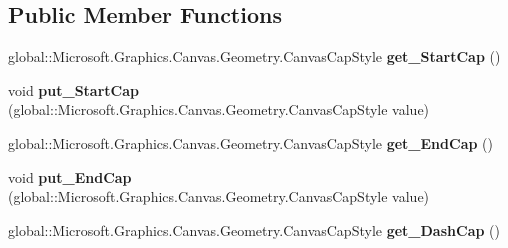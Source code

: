 \subsection*{Public Member Functions}
\begin{DoxyCompactItemize}
\item 
\mbox{\label{interface_microsoft_1_1_graphics_1_1_canvas_1_1_geometry_1_1_i_canvas_stroke_style_a23f30b5c717e10b15ce38fa7d3721e03}} 
global\+::\+Microsoft.\+Graphics.\+Canvas.\+Geometry.\+Canvas\+Cap\+Style {\bfseries get\+\_\+\+Start\+Cap} ()
\item 
\mbox{\label{interface_microsoft_1_1_graphics_1_1_canvas_1_1_geometry_1_1_i_canvas_stroke_style_a2fdd3aee781a3fb799081a2ec567b732}} 
void {\bfseries put\+\_\+\+Start\+Cap} (global\+::\+Microsoft.\+Graphics.\+Canvas.\+Geometry.\+Canvas\+Cap\+Style value)
\item 
\mbox{\label{interface_microsoft_1_1_graphics_1_1_canvas_1_1_geometry_1_1_i_canvas_stroke_style_aab45339696dfcadb0ae0eb8e89bb68e4}} 
global\+::\+Microsoft.\+Graphics.\+Canvas.\+Geometry.\+Canvas\+Cap\+Style {\bfseries get\+\_\+\+End\+Cap} ()
\item 
\mbox{\label{interface_microsoft_1_1_graphics_1_1_canvas_1_1_geometry_1_1_i_canvas_stroke_style_aef264fbe0fcf18df425b8904ea4dca31}} 
void {\bfseries put\+\_\+\+End\+Cap} (global\+::\+Microsoft.\+Graphics.\+Canvas.\+Geometry.\+Canvas\+Cap\+Style value)
\item 
\mbox{\label{interface_microsoft_1_1_graphics_1_1_canvas_1_1_geometry_1_1_i_canvas_stroke_style_a6460321748d903188a3fd0c96b9309df}} 
global\+::\+Microsoft.\+Graphics.\+Canvas.\+Geometry.\+Canvas\+Cap\+Style {\bfseries get\+\_\+\+Dash\+Cap} ()
\item 
\mbox{\label{interface_microsoft_1_1_graphics_1_1_canvas_1_1_geometry_1_1_i_canvas_stroke_style_a2c6fb2a6009bda6b6bf0b8882ec5b651}} 

\end{DoxyCompactItemize}
